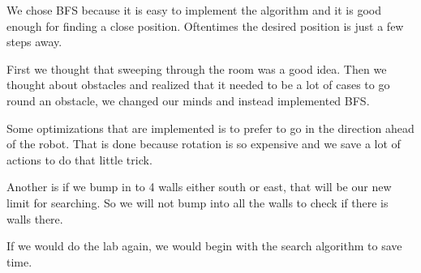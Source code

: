 \documentclass[12pt,a4paper]{article}
\begin{document}
We chose BFS because it is easy to implement the algorithm and it is good enough for finding a close position. Oftentimes the desired position is just a few steps away.

First we thought that sweeping through the room was a good idea. Then we thought about obstacles and realized that it needed to be a lot of cases to go round an obstacle, we changed our minds and instead implemented BFS.

Some optimizations that are implemented is to prefer to go in the direction ahead of the robot. That is done because rotation is so expensive and we save a lot of actions to do that little trick.

Another is if we bump in to 4 walls either south or east, that will be our new limit for searching. So we will not bump into all the walls to check if there is walls there.

If we would do the lab again, we would begin with the search algorithm to save time.
\end{document}
